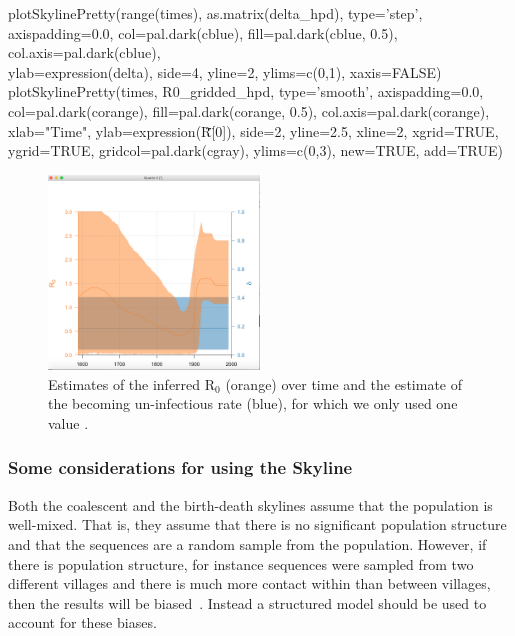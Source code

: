 \documentclass[11pt]{article}
\begin{document}
\begin{framed}
plotSkylinePretty(range(times), as.matrix(delta\_hpd), type='step', axispadding=0.0, col=pal.dark(cblue), fill=pal.dark(cblue, 0.5), col.axis=pal.dark(cblue), \\
ylab=expression(delta), side=4, yline=2, ylims=c(0,1), xaxis=FALSE) \\
plotSkylinePretty(times, R0\_gridded\_hpd, type='smooth', axispadding=0.0, col=pal.dark(corange), fill=pal.dark(corange, 0.5), col.axis=pal.dark(corange), \\
xlab="Time", ylab=expression(\"R\"[0]), side=2, yline=2.5, xline=2, xgrid=TRUE, ygrid=TRUE, gridcol=pal.dark(cgray), ylims=c(0,3), new=TRUE, add=TRUE) 
\end{framed}

\begin{figure}[h!]
\centering
\includegraphics[width=0.5\textwidth]{figures/bdsky_output.png}
\caption{\small Estimates of the inferred R$_{0}$ (orange) over time and the estimate of the becoming un-infectious rate (blue), for which we only used one value .}
\label{fig:bdsky_out}
\end{figure}


\subsubsection{Some considerations for using the Skyline}

Both the coalescent and the birth-death skylines assume that the population is well-mixed. That is, they assume that there is no significant population structure and that the sequences are a random sample from the population. However, if there is population structure, for instance sequences were sampled from two different villages and there is much more contact within than between villages, then the results will be biased~\citep{Heller2013}. Instead a structured model should be used to account for these biases.
\end{document}
